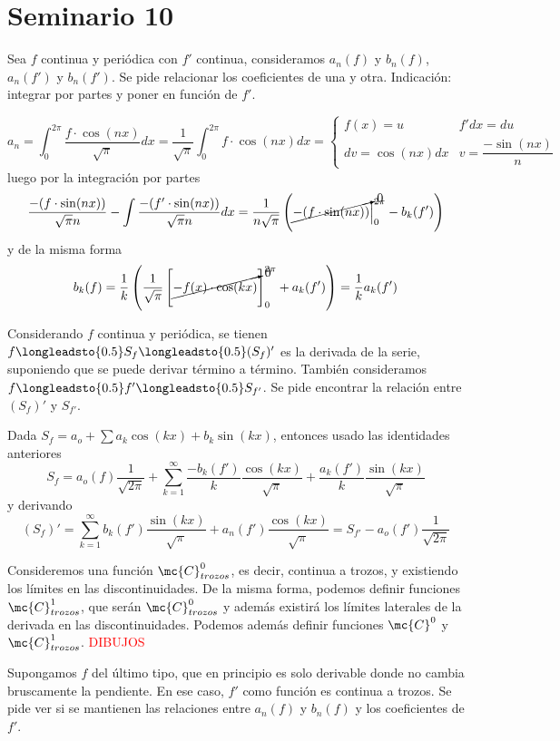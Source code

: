 \section{Seminario 10}
\begin{ejer} Sea $f$ continua y periódica con $f'$ continua, consideramos $a_n(f)$ y $b_n(f)$, $a_n(f')$ y $b_n(f')$. Se pide relacionar los coeficientes de una y otra. Indicación: integrar por partes y poner en función de $f'$.
    
\end{ejer}
            \begin{sol}
                $$a_n=\int_0^{2 \pi}  \dfrac{f \cdot \cos(nx)}{\sqrt{\pi}} dx=\dfrac{1}{\sqrt{\pi}} \int_0^{2 \pi}  f \cdot \cos(nx) dx= \begin{cases}
                    f(x)=u & f'dx=du \\ dv=\cos(nx) dx & v=\dfrac{-\sin(nx)}{n}
                \end{cases}$$
                luego por la integración por partes
                $$ \dfrac{-(f \cdot \sin(nx))}{\sqrt{\pi}n} - \int \dfrac{-(f' \cdot \sin(nx))}{\sqrt{\pi}n} dx = \dfrac{1}{n\sqrt{\pi}} \left( \cancelto{0}{-(f \cdot \sin(nx))}\Big|_0^{2\pi} - b_k(f')\right)$$
                y de la misma forma
                $$b_k(f)=\dfrac{1}{k} \left(\dfrac{1}{\sqrt{\pi}} \left[ \cancelto{0}{-f(x) \cdot \cos(kx)}\right]_{0}^{2\pi} + a_k(f')\right)=\dfrac{1}{k}a_k(f')$$
            \end{sol}
 \begin{ejer}
 Considerando $f$ continua y periódica, se tienen $f \longleadsto{0.5} S_f \longleadsto{0.5} (S_f)'$ es la derivada de la serie, suponiendo que se puede derivar término a término. También consideramos $f \longleadsto{0.5} f' \longleadsto{0.5} S_{f'}$. Se pide encontrar la relación entre $(S_f)'$ y $S_{f'}$.
 \end{ejer}
 \begin{sol}
     Dada $S_f=a_o+\sum a_k \cos(kx)+b_k \sin(kx)$, entonces usado las identidades anteriores
     $$S_f=a_o(f)\dfrac{1}{\sqrt{2\pi}}+\sum_{k=1}^{\infty} \dfrac{-b_k(f')}{k} \dfrac{\cos(kx)}{\sqrt{\pi}}+ \dfrac{a_k(f')}{k} \dfrac{\sin(kx)}{\sqrt{\pi}}$$
     y derivando
     $$(S_f)'=\sum_{k=1}^{\infty} b_k(f') \dfrac{\sin(kx)}{\sqrt{\pi}} + a_n(f') \dfrac{\cos(kx)}{\sqrt{\pi}} = S_{f'} - a_o(f')\dfrac{1}{\sqrt{2\pi}}$$
 \end{sol}
 \begin{obs}
 Consideremos una función $\mc{C}^0_{trozos}$, es decir, continua a trozos, y existiendo los límites en las discontinuidades. De la misma forma, podemos definir funciones  $\mc{C}^1_{trozos}$, que serán  $\mc{C}^0_{trozos}$ y además existirá los límites laterales de la derivada en las discontinuidades. Podemos además definir funciones $\mc{C}^0$ y $\mc{C}^1_{trozos}$. \textcolor{red}{DIBUJOS}
 \end{obs}
 \begin{ejer}
     Supongamos $f$ del último tipo, que en principio es solo derivable donde no cambia bruscamente la pendiente. En ese caso, $f'$ como función es continua a trozos. Se pide ver si se mantienen las relaciones entre $a_n(f)$ y $b_n(f)$ y los coeficientes de $f'$.
 \end{ejer}
